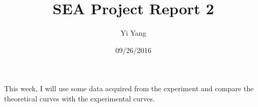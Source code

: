 \documentclass[letterpaper]{article}
\author{Yi Yang}
\title{SEA Project Report 2}
\begin{document}
\date{09/26/2016}
\maketitle

\newcommand{\trace}{\mathrm{trace}}
\newcommand{\real}{\mathbb R}  %
\newcommand{\nat}{\mathbb N}   %
\newcommand{\cp}{\mathbb C}    %
\newcommand{\ds}{\displaystyle}
\newcommand{\mf}[2]{\frac{\ds #1}{\ds #2}}
\newcommand{\spanof}[1]{\textrm{span} \{ #1 \}}
\newcommand{\sol}[0]{\textbf{Solution: }}
\newcommand{\pf}[0]{\textbf{Proof:}}
\newcommand{\rme}[0]{\textrm{e}}
\newcommand{\Null}[1]{\textrm{Null}\{#1\}}
\parindent 0pt
This week, I will use some data acquired from the experiment and compare the theoretical curves with the experimental curves.\\
\end{document}
